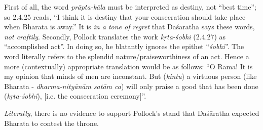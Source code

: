First of all, the word {\sl prāpta-kāla} must be interpreted as destiny, not “best time”; so 2.4.25 reads, “I think it is destiny that your consecration should take place when Bharata is away.” It is {\sl in a tone of regret} that Daśaratha says these words, {\sl not craftily}. Secondly, Pollock translates the work {\sl kṛta-śobhi} (2.4.27) as “accomplished act”. In doing so, he blatantly ignores the epithet “{\sl śobhi}”. The word literally refers to the splendid nature/praiseworthiness of an act. Hence a more (contextually) appropriate translation would be as follows: “O Rāma! It is my opinion that minds of men are inconstant. But ({\sl kintu}) a virtuous person (like Bharata - {\sl dharma-nityānām satām ca}) will only praise a good that has been done ({\sl kṛta-śobhi}), [i.e. the consecration ceremony]”.

{\sl Literally}, there is no evidence to support Pollock’s stand that Daśāratha expected Bharata to contest the throne. 

